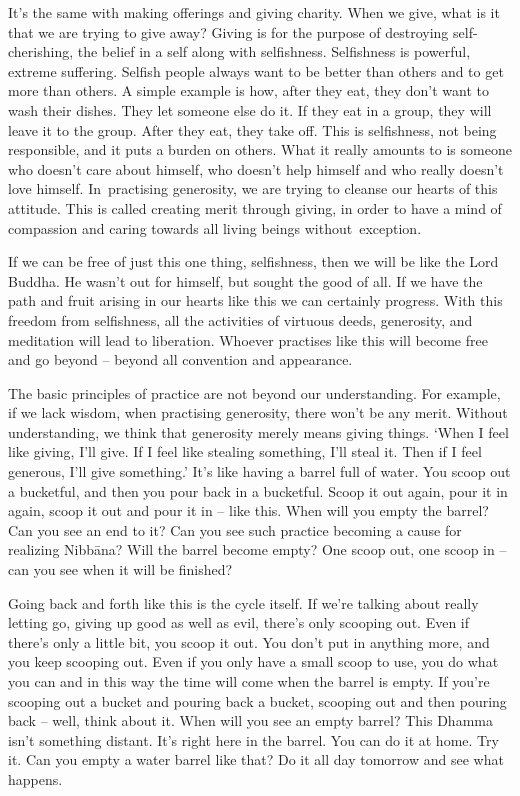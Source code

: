 It's the same with making offerings and giving charity. When we give, what is it that we are trying to give away? Giving is for the purpose of destroying self-cherishing, the belief in a self along with selfishness. Selfishness is powerful, extreme suffering. Selfish people always want to be better than others and to get more than others. A simple example is how, after they eat, they don't want to wash their dishes. They let someone else do it. If they eat in a group, they will leave it to the group. After they eat, they take off. This is selfishness, not being responsible, and it puts a burden on others. What it really amounts to is someone who doesn't care about himself, who doesn't help himself and who really doesn't love himself. \mbox{In practising} generosity, we are trying to cleanse our hearts of this attitude. This is called creating merit through giving, in order to have a mind of compassion and caring towards all living beings \mbox{without exception.}

If we can be free of just this one thing, selfishness, then we will be like the Lord Buddha. He wasn't out for himself, but sought the good of all. If we have the path and fruit arising in our hearts like this we can certainly progress. With this freedom from selfishness, all the activities of virtuous deeds, generosity, and meditation will lead to liberation. Whoever practises like this will become free and go beyond -- beyond all convention and appearance. 

The basic principles of practice are not beyond our understanding. For example, if we lack wisdom, when practising generosity, there won't be any merit. Without understanding, we think that generosity merely means giving things. `When I feel like giving, I'll give. If I feel like stealing something, I'll steal it. Then if I feel generous, I'll give something.' It's like having a barrel full of water. You scoop out a bucketful, and then you pour back in a bucketful. Scoop it out again, pour it in again, scoop it out and pour it in -- like this. When will you empty the barrel? Can you see an end to it? Can you see such practice becoming a cause for realizing Nibb\=ana? Will the barrel become empty? One scoop out, one scoop in -- can you see when it will be finished? 

Going back and forth like this is  the cycle itself. If we're talking about really letting go, giving up good as well as evil, there's only scooping out. Even if there's only a little bit, you scoop it out. You don't put in anything more, and you keep scooping out. Even if you only have a small scoop to use, you do what you can and in this way the time will come when the barrel is empty. If you're scooping out a bucket and pouring back a bucket, scooping out and then pouring back -- well, think about it. When will you see an empty barrel? This Dhamma isn't something distant. It's right here in the barrel. You can do it at home. Try it. Can you empty a water barrel like that? Do it all day tomorrow and see what happens. 

